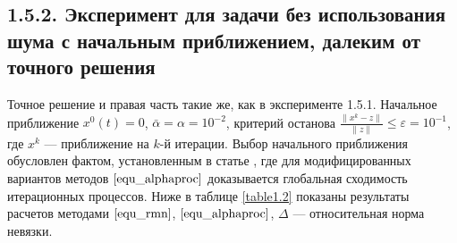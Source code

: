 \subsection*{1.5.2. Эксперимент для задачи без использования шума с начальным приближением, далеким от точного решения} 

Точное решение и правая часть такие же, как в эксперименте 1.5.1.  Начальное приближение $x^0(t)=0$, $\bar\alpha=\alpha=10^{-2}$, критерий останова $\frac{\|x^k-z\|}{\|z\|}\le\varepsilon=10^{-1}$, где $x^k$ --- приближение на $k$-й итерации. Выбор начального приближения обусловлен фактом, установленным в статье \cite{Vasin2016}, где для модифицированных вариантов методов $\eqref{equ_alphaproc}$ доказывается глобальная сходимость итерационных процессов. %
Ниже в таблице \ref{table1.2} показаны результаты расчетов методами $\eqref{equ_rmn}$, $\eqref{equ_alphaproc}$, $\Delta$ --- относительная норма невязки. 
